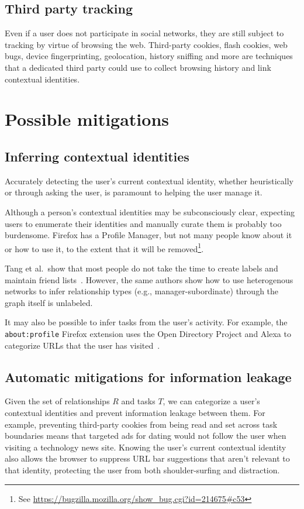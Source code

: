 \documentclass{llncs}
\begin{document}
\subsection{Third party tracking}
\label{sec:tracking}
Even if a user does not participate in social networks, they are still subject
to tracking by virtue of browsing the web. Third-party cookies, flash cookies,
web bugs, device fingerprinting, geolocation, history sniffing and more are
techniques that a dedicated third party could use to collect browsing history
and link contextual identities.

\section{Possible mitigations}

\subsection{Inferring contextual identities}
Accurately detecting the user's current contextual identity, whether
heuristically or through asking the user, is paramount to helping the user
manage it.

Although a person's contextual identities may be subconsciously clear,
expecting users to enumerate their identities and manually curate them is
probably too burdensome. Firefox has a Profile Manager, but not many people
know about it or how to use it, to the extent that it will be
removed\footnote{See \url{https://bugzilla.mozilla.org/show\_bug.cgi?id=214675\#c53}}.

Tang et al.~show that most people do not take the time to create labels and
maintain friend lists~\cite{tang}. However, the same authors show how to use
heterogenous networks to infer relationship types (e.g., manager-subordinate)
through the graph itself is unlabeled.

It may also be possible to infer tasks from the user's activity. For example,
the \texttt{about:profile} Firefox extension uses the Open Directory Project
and Alexa to categorize URLs that the user has visited~\cite{aboutprofile}.

\subsection{Automatic mitigations for information leakage}
Given the set of relationships $R$ and tasks $T$, we can categorize a user's
contextual identities and prevent information leakage between them.  For
example, preventing third-party cookies from being read and set across task
boundaries means that targeted ads for dating would not follow the user when
visiting a technology news site. Knowing the user's current contextual identity
also allows the browser to suppress URL bar suggestions that aren't relevant to
that identity, protecting the user from both shoulder-surfing and distraction.
\end{document}
